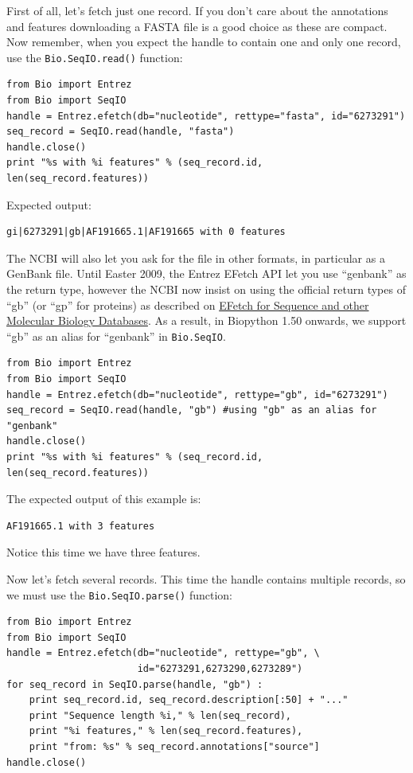 \documentclass{report}
\begin{document}
First of all, let's fetch just one record.  If you don't care about the
annotations and features downloading a FASTA file is a good choice as these
are compact.  Now remember, when you expect the handle to contain one and
only one record, use the \verb|Bio.SeqIO.read()| function:

\begin{verbatim}
from Bio import Entrez
from Bio import SeqIO
handle = Entrez.efetch(db="nucleotide", rettype="fasta", id="6273291")
seq_record = SeqIO.read(handle, "fasta")
handle.close()
print "%s with %i features" % (seq_record.id, len(seq_record.features))
\end{verbatim}

\noindent Expected output:

\begin{verbatim}
gi|6273291|gb|AF191665.1|AF191665 with 0 features
\end{verbatim}

The NCBI will also let you ask for the file in other formats, in particular as
a GenBank file. Until Easter 2009, the Entrez EFetch API let you use ``genbank''
as the return type, however the NCBI now insist on using the official
return types of ``gb'' (or ``gp'' for proteins) as described on
\href{http://www.ncbi.nlm.nih.gov/entrez/query/static/efetchseq_help.html}
{EFetch for Sequence and other Molecular Biology Databases}.
As a result, in Biopython 1.50 onwards, we support ``gb'' as an
alias for ``genbank'' in \verb|Bio.SeqIO|.

\begin{verbatim}
from Bio import Entrez
from Bio import SeqIO
handle = Entrez.efetch(db="nucleotide", rettype="gb", id="6273291")
seq_record = SeqIO.read(handle, "gb") #using "gb" as an alias for "genbank"
handle.close()
print "%s with %i features" % (seq_record.id, len(seq_record.features))
\end{verbatim}

\noindent The expected output of this example is:

\begin{verbatim}
AF191665.1 with 3 features
\end{verbatim}

\noindent Notice this time we have three features.

Now let's fetch several records.  This time the handle contains multiple records,
so we must use the \verb|Bio.SeqIO.parse()| function:

\begin{verbatim}
from Bio import Entrez
from Bio import SeqIO
handle = Entrez.efetch(db="nucleotide", rettype="gb", \
                       id="6273291,6273290,6273289")
for seq_record in SeqIO.parse(handle, "gb") :
    print seq_record.id, seq_record.description[:50] + "..."
    print "Sequence length %i," % len(seq_record),
    print "%i features," % len(seq_record.features),
    print "from: %s" % seq_record.annotations["source"]
handle.close()
\end{verbatim}
\end{document}
